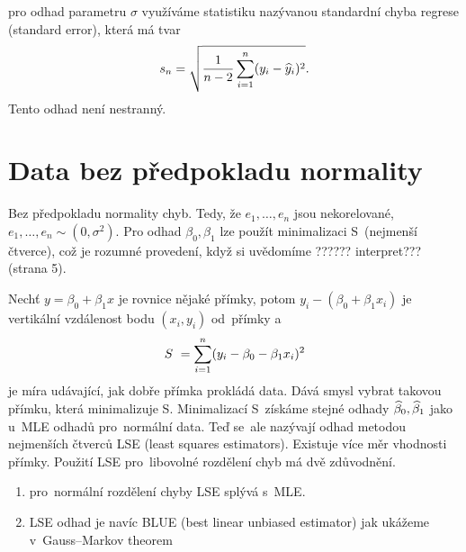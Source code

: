 pro odhad parametru $ \sigma $ využíváme statistiku nazývanou standardní chyba regrese (standard error), která má tvar
$$
 s_{n} = \sqrt{\frac{1}{n-2} \sum\limits_{i=1}^{n}(y_{i} -  \widehat{y}_{i})^{2}}.
$$
Tento odhad není nestranný.

\section{Data bez předpokladu normality}
Bez předpokladu normality chyb. Tedy, že $ e_{1}, \dots , e_{n} $ jsou nekorelované, $ e_{1}, \dots , e_{n} \sim (0,\sigma^{2}) $.
Pro odhad $ \beta_{0}, \beta_{1} $ lze použít minimalizaci S~(nejmenší čtverce), což je rozumné provedení, když si uvědomíme ?????? interpret??? (strana 5).

Nechť $ y = \beta_{0} + \beta_{1} x  $ je rovnice nějaké přímky, potom $ y_{i} - (\beta_{0} + \beta_{1} x_{i}) $ je vertikální vzdálenost bodu $ (x_{i},y_{i}) $ od~přímky a~
$$
 S~= \sum\limits_{i=1}^{n} (y_{i} - \beta_{0} - \beta_{1} x_{i})^{2}
$$
je míra udávající, jak dobře přímka prokládá data. Dává smysl vybrat takovou přímku, která minimalizuje S. Minimalizací S~získáme stejné odhady $  \widehat{\beta}_{0}, \widehat{\beta}_{1} $ jako u~MLE odhadů pro~normální data. Teď se~ale nazývají odhad metodou nejmenších čtverců LSE (least squares estimators).
Existuje více měr vhodnosti přímky. Použití LSE pro~libovolné rozdělení chyb má dvě zdůvodnění.
\begin{enumerate}
  \item pro~normální rozdělení chyby LSE splývá s~MLE.
  \item LSE odhad je navíc BLUE (best linear unbiased estimator) jak ukážeme v~Gauss–Markov theorem
\end{enumerate}

